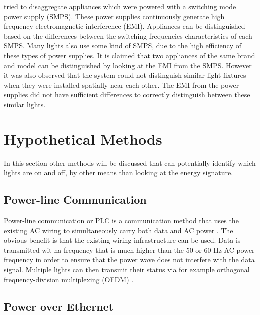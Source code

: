 		\cite{Gupta:2010} tried to disaggregate appliances which were powered with a switching mode power supply (SMPS).
		These power supplies continuously generate high frequency electromagnetic interference (EMI).
		Appliances can be distinguished based on the differences between the switching frequencies characteristics of each SMPS.
		Many lights also use some kind of SMPS, due to the high efficiency of these types of power supplies.
		It is claimed that two appliances of the same brand and model can be distinguished by looking at the EMI from the SMPS.
		However it was also observed that the system could not distinguish similar light fixtures when they were installed spatially near each other.
		The EMI from the power supplies did not have sufficient differences to correctly distinguish between these similar lights. 


		

	\section{Hypothetical Methods}

		In this section other methods will be discussed that can potentially identify which lights are on and off, by other means than looking at the energy signature.





		\subsection{Power-line Communication}

		Power-line communication or PLC is a communication method that uses the existing AC wiring to simultaneously carry both data and AC power \cite{1205458}.
		The obvious benefit is that the existing wiring infrastructure can be used.
		Data is transmitted wit ha frequency that is much higher than the 50 or 60 Hz AC power frequency in order to ensure that the power wave does not interfere with the data signal.
		Multiple lights can then transmit their status via for example orthogonal frequency-division multiplexing (OFDM) \cite{hoch2011comparison}.




		\subsection{Power over Ethernet}

